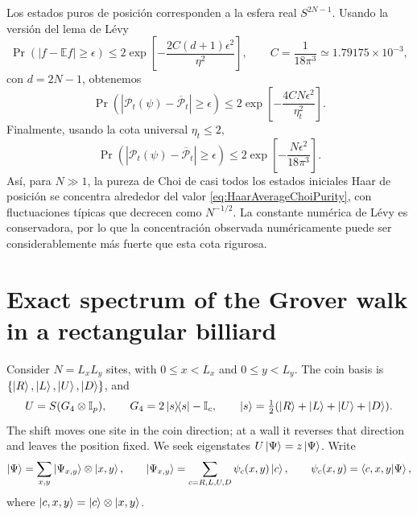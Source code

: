 Los estados puros de posición corresponden a la esfera real
$S^{2N-1}$. Usando la versión del lema de Lévy
\begin{equation}
    \Pr\left(
        |f-\mathbb Ef|\geq\epsilon
    \right)
    \leq
    2\exp\left[
        -\frac{2C(d+1)\epsilon^2}{\eta^2}
    \right],
    \qquad
    C=\frac{1}{18\pi^3}
    \simeq1.79175\times10^{-3},
\end{equation}
con $d=2N-1$, obtenemos
\begin{equation}
    \boxed{
    \Pr\left(
        |\mathcal P_t(\psi)-\overline{\mathcal P}_t|
        \geq\epsilon
    \right)
    \leq
    2\exp\left[
        -\frac{4CN\epsilon^2}{\eta_t^2}
    \right].
    }
\end{equation}
Finalmente, usando la cota universal $\eta_t\leq2$,
\begin{equation}
    \boxed{
    \Pr\left(
        |\mathcal P_t(\psi)-\overline{\mathcal P}_t|
        \geq\epsilon
    \right)
    \leq
    2\exp\left[
        -\frac{N\epsilon^2}{18\pi^3}
    \right].
    }
    \label{eq:ChoiPurityLevy}
\end{equation}
Así, para $N\gg1$, la pureza de Choi de casi todos los estados iniciales
Haar de posición se concentra alrededor del valor
\eqref{eq:HaarAverageChoiPurity}, con fluctuaciones típicas que decrecen
como $N^{-1/2}$. La constante numérica de Lévy es conservadora, por lo que
la concentración observada numéricamente puede ser considerablemente más
fuerte que esta cota rigurosa.

\section{Exact spectrum of the Grover walk in a rectangular billiard} %
\label{app:grover-rectangle-spectrum}

Consider $N=L_xL_y$ sites, with $0\leq x<L_x$ and $0\leq y<L_y$.
The coin basis is $\{\ket{R},\ket{L},\ket{U},\ket{D}\}$, and
\begin{equation}
 U=S(G_4\otimes\mathbb I_p),\qquad
 G_4=2\ketbra{s}{s}-\mathbb I_c,\qquad
 \ket{s}=\tfrac12(\ket{R}+\ket{L}+\ket{U}+\ket{D}).
 \label{eq:appendix-grover-def}
\end{equation}
The shift moves one site in the coin direction; at a wall it reverses that
direction and leaves the position fixed. We seek eigenstates
$U\ket{\Psi}=z\ket{\Psi}$. Write
\begin{equation}
 \ket{\Psi}=\sum_{x,y}\ket{\Psi_{x,y}}\otimes\ket{x,y},\qquad
 \ket{\Psi_{x,y}}=\sum_{c=R,L,U,D}\psi_c(x,y)\ket{c},\qquad
 \psi_c(x,y)=\braket{c,x,y}{\Psi},
 \label{eq:appendix-grover-amplitudes}
\end{equation}
where $\ket{c,x,y}=\ket{c}\otimes\ket{x,y}$.


